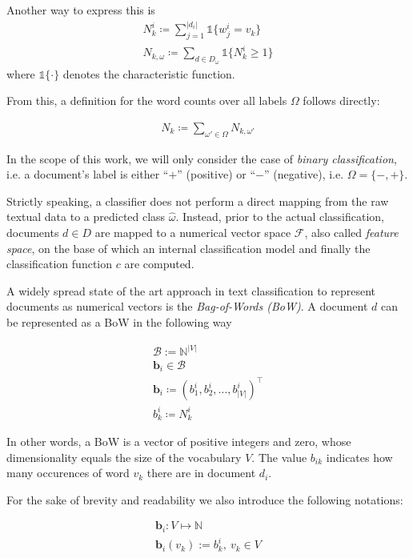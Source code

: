 Another way to express this is
\begin{eqnarray*}
 N_k^i \coloneqq \sum\limits_{j=1}^{|d_i|} \mathbb{1}\{w_j^i = v_k\} \\
 N_{k,\omega} \coloneqq \sum\limits_{d \in D_\omega} \mathbb{1}\{N^i_k \geq 1\} 
\end{eqnarray*}
where $\mathbb{1}\{\cdot\}$ denotes the characteristic function.

From this, a definition for the word counts over all labels $\Omega$ follows
directly:

\begin{eqnarray*}
N_k \coloneqq \sum_{\omega'\in \Omega} N_{k,\omega'} 
\end{eqnarray*}

In the scope of this work, we will only consider the case of \emph{binary
classification}, i.e. a document's label is either ``$+$'' (positive) or
``$-$'' (negative), i.e.  $\Omega = \{-,+\}$.

Strictly speaking, a classifier does not perform a direct mapping from
the raw textual data to a predicted class $\hat{\omega}$. Instead, prior to the actual
classification, documents $d \in D$ are mapped to a numerical vector
space $\mathcal{F}$, also called \emph{feature space}, on the base of which an internal 
classification model and finally the classification function $c$ are computed.

A widely spread state of the art approach in text classification to represent
documents as numerical vectors is the \emph{Bag-of-Words (BoW)}.
A document $d$ can be represented as a BoW in the following way

\begin{eqnarray*}
	\mathcal{B} := \mathbb{N}^{|V|} \\
	\mathbf{b}_i \in \mathcal{B} \\
	\mathbf{b}_i \coloneqq (b_1^i, b_2^i, \ldots, b_{|V|}^i)^\intercal \\
	b_k^i \coloneqq N_k^i
\end{eqnarray*}
	
In other words, a BoW is a vector of positive integers and zero, whose
dimensionality equals the size of the vocabulary $V$. The value $b_{ik}$
indicates how many occurences of word $v_k$ there are in document
$d_i$.

For the sake of brevity and readability we also introduce the following
notations:

\begin{eqnarray*}
	\mathbf{b}_i: V \mapsto \mathbb{N} \\
	\mathbf{b}_i(v_k) := b_k^i,\ v_k \in V
\end{eqnarray*}

